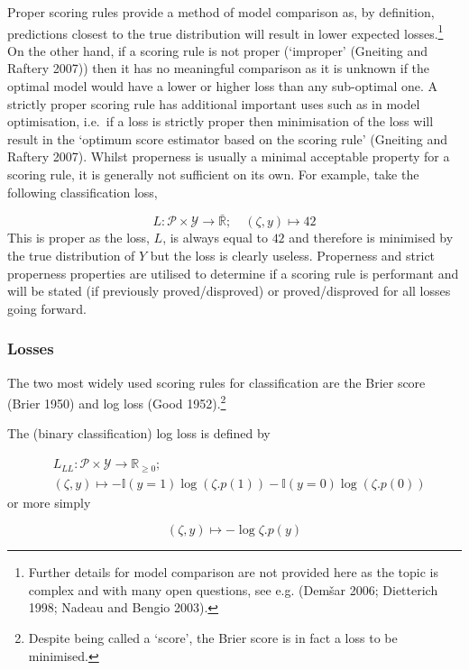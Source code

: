 \documentclass[
  letterpaper,
]{scrbook}
\theoremstyle{plain}
\theoremstyle{definition}
\theoremstyle{remark}
\begin{document}
Proper scoring rules provide a method of model comparison as, by
definition, predictions closest to the true distribution will result in
lower expected losses.\footnote{Further details for model comparison are
  not provided here as the topic is complex and with many open
  questions, see e.g. (Demšar 2006; Dietterich 1998; Nadeau and Bengio
  2003).} On the other hand, if a scoring rule is not proper (`improper'
(Gneiting and Raftery 2007)) then it has no meaningful comparison as it
is unknown if the optimal model would have a lower or higher loss than
any sub-optimal one. A strictly proper scoring rule has additional
important uses such as in model optimisation, i.e.~if a loss is strictly
proper then minimisation of the loss will result in the `optimum score
estimator based on the scoring rule' (Gneiting and Raftery 2007). Whilst
properness is usually a minimal acceptable property for a scoring rule,
it is generally not sufficient on its own. For example, take the
following classification loss,

\[
L: \mathcal{P}\times \mathcal{Y}\rightarrow \bar{\mathbb{R}};
\quad (\zeta, y) \mapsto 42
\] This is proper as the loss, \(L\), is always equal to \(42\) and
therefore is minimised by the true distribution of \(Y\) but the loss is
clearly useless. Properness and strict properness properties are
utilised to determine if a scoring rule is performant and will be stated
(if previously proved/disproved) or proved/disproved for all losses
going forward.

\hypertarget{losses}{%
\subsubsection*{Losses}\label{losses}}

The two most widely used scoring rules for classification are the Brier
score (Brier 1950) and log loss (Good 1952).\footnote{Despite being
  called a `score', the Brier score is in fact a loss to be minimised.}

The (binary classification) log loss is defined by

\[
\begin{split}
&L_{LL}:\mathcal{P}\times \mathcal{Y}\rightarrow \mathbb{R}_{\geq 0}; \\
&(\zeta, y) \mapsto -\mathbb{I}(y = 1)\log(\zeta.p(1)) - \mathbb{I}(y = 0)\log(\zeta.p(0))
\end{split}
\] or more simply

\[
(\zeta, y) \mapsto -\log \zeta.p(y)
\]
\end{document}
